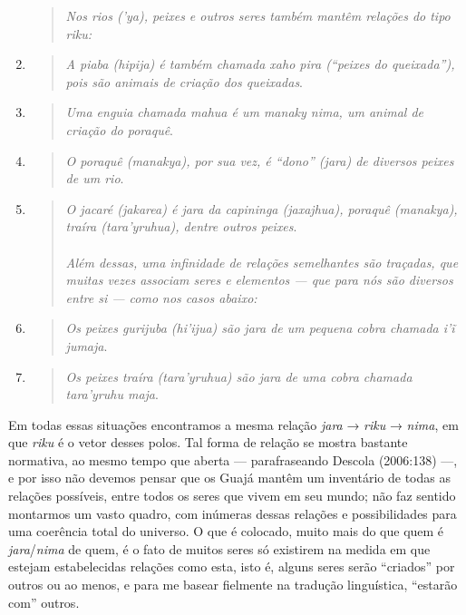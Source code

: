 \begin{enumerate}
\begin{quote}
  \emph{Nos rios ('\emph{ya}), peixes e outros seres também mantêm relações
    do tipo \emph{riku}:}
    \\
  \end{quote}
\item
  \begin{quote}
  \emph{A piaba (\emph{hipija}) é também chamada \emph{xaho pira} (``peixes do
    queixada''), pois são animais de criação dos queixadas}.
  \end{quote}
\item
  \begin{quote}
  \emph{Uma enguia chamada \emph{mahua} é um \emph{manaky} \emph{nima}, um
    animal de criação do poraquê}.
  \end{quote}
\item
  \begin{quote}
  \emph{O poraquê (\emph{manakya}), por sua vez, é ``dono'' (\emph{jara}) de
    diversos peixes de um rio}.
  \end{quote}
\item
  \begin{quote}
  \emph{O jacaré (\emph{jakarea}) é \emph{jara} da capininga
    (\emph{jaxajhua}), poraquê (\emph{manakya}), traíra
    (\emph{tara'yruhua}), dentre outros peixes}.\\
  ~\\
  \emph{Além dessas, uma infinidade de relações semelhantes são traçadas, que
    muitas vezes associam seres e elementos --- que para nós são diversos
    entre si --- como nos casos abaixo:}
    \\
  \end{quote}
\item
  \begin{quote}
  \emph{Os peixes gurijuba (\emph{hi'ijua}) são \emph{jara} de um pequena
    cobra chamada \emph{i'ĩ jumaja}}.
  \end{quote}
\item
  \begin{quote}
  \emph{Os peixes traíra (\emph{tara'yruhua}) são \emph{jara} de uma cobra
    chamada \emph{tara'yruhu maja}}.
  \end{quote}
\end{enumerate}

Em todas essas situações encontramos a mesma relação \emph{jara} →
\emph{riku} → \emph{nima}, em que \emph{riku} é o vetor desses polos.
Tal forma de relação se mostra bastante normativa, ao mesmo tempo que
aberta --- parafraseando Descola (2006:138) ---, e por isso não devemos
pensar que os Guajá mantêm um inventário de todas as relações possíveis,
entre todos os seres que vivem em seu mundo; não faz sentido montarmos
um vasto quadro, com inúmeras dessas relações e possibilidades para uma
coerência total do universo. O que é colocado, muito mais do que quem é
\emph{jara}/\emph{nima} de quem, é o fato de muitos seres só existirem
na medida em que estejam estabelecidas relações como esta, isto é,
alguns seres serão ``criados'' por outros ou ao menos, e para me basear
fielmente na tradução linguística, ``estarão com'' outros.

